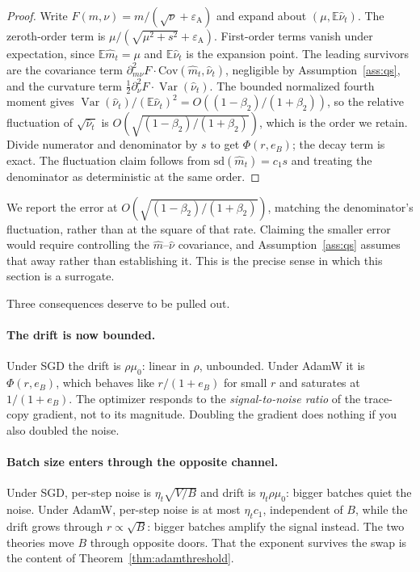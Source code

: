 \documentclass{article}
\theoremstyle{plain}
\theoremstyle{definition}
\theoremstyle{remark}
\newcommand{\E}{\mathbb{E}}
\newcommand{\Var}{\operatorname{Var}}
\newcommand{\1}{\mathbf{1}}
\begin{document}
\begin{proof}
Write $F(m,\nu) = m/(\sqrt\nu+\varepsilon_{\mathrm A})$ and expand about
$(\mu,\E\hat\nu_t)$. The zeroth-order term is
$\mu/(\sqrt{\mu^2+s^2}+\varepsilon_{\mathrm A})$. First-order terms vanish under
expectation, since $\E\hat m_t = \mu$ and $\E\hat\nu_t$ is the expansion point.
The leading survivors are the covariance term
$\partial^2_{m\nu}F\cdot\mathrm{Cov}(\hat m_t,\hat\nu_t)$, negligible by
Assumption~\ref{ass:qs}, and the curvature term
$\tfrac12\partial^2_{\nu}F\cdot\Var(\hat\nu_t)$. The bounded normalized fourth
moment gives $\Var(\hat\nu_t)/(\E\hat\nu_t)^2 = O((1-\beta_2)/(1+\beta_2))$, so
the relative fluctuation of $\sqrt{\hat\nu_t}$ is
$O(\sqrt{(1-\beta_2)/(1+\beta_2)})$, which is the order we retain. Divide
numerator and denominator by $s$ to get $\Phi(r,e_B)$; the decay term is exact.
The fluctuation claim follows from $\mathrm{sd}(\hat m_t) = c_1s$ and treating
the denominator as deterministic at the same order.
\end{proof}

We report the error at $O(\sqrt{(1-\beta_2)/(1+\beta_2)})$, matching the
denominator's fluctuation, rather than at the square of that rate. Claiming the
smaller error would require controlling the $\hat m$--$\hat\nu$ covariance, and
Assumption~\ref{ass:qs} assumes that away rather than establishing it. This is
the precise sense in which this section is a surrogate.

Three consequences deserve to be pulled out.

\paragraph{The drift is now bounded.}
Under SGD the drift is $\rho\mu_0$: linear in $\rho$, unbounded. Under AdamW it
is $\Phi(r,e_B)$, which behaves like $r/(1+e_B)$ for small $r$ and saturates at
$1/(1+e_B)$. The optimizer responds to the \emph{signal-to-noise ratio} of the
trace-copy gradient, not to its magnitude. Doubling the gradient does nothing if
you also doubled the noise.

\paragraph{Batch size enters through the opposite channel.}
Under SGD, per-step noise is $\eta_t\sqrt{V/B}$ and drift is $\eta_t\rho\mu_0$:
bigger batches quiet the noise. Under AdamW, per-step noise is at most
$\eta_tc_1$, independent of $B$, while the drift grows through $r\propto\sqrt B$:
bigger batches amplify the signal instead. The two theories move $B$ through
opposite doors. That the exponent survives the swap is the content of
Theorem~\ref{thm:adamthreshold}.
\end{document}
